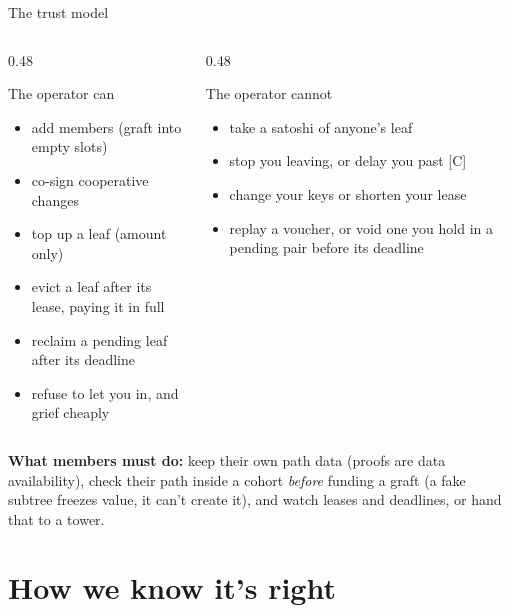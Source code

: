 \documentclass[aspectratio=169,10pt]{beamer}
\begin{document}
\begin{frame}{The trust model}
  \begin{columns}[T]
    \begin{column}{0.48\textwidth}
      \begin{block}{The operator can}
        \begin{itemize}
          \item add members (graft into empty slots)
          \item co-sign cooperative changes
          \item top up a leaf (amount only)
          \item evict a leaf after its lease, paying it in full
          \item reclaim a pending leaf after its deadline
          \item refuse to let you in, and grief cheaply
        \end{itemize}
      \end{block}
    \end{column}
    \begin{column}{0.48\textwidth}
      \begin{block}{The operator cannot}
        \begin{itemize}
          \item take a satoshi of anyone's leaf
          \item stop you leaving, or delay you past [C]
          \item change your keys or shorten your lease
          \item replay a voucher, or void one you hold in a pending pair before its deadline
        \end{itemize}
      \end{block}
    \end{column}
  \end{columns}
  \vspace{0.6em}
  \textbf{What members must do:} keep their own path data (proofs are data availability), check their path inside a cohort \emph{before} funding a graft (a fake subtree freezes value, it can't create it), and watch leases and deadlines, or hand that to a tower.
\end{frame}

\section{How we know it's right}
\end{document}
